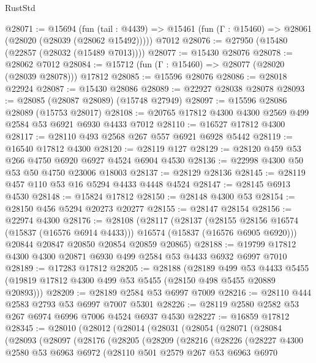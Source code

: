 \begin{lexlean}{RustStd}
\begin{coremodule}
@28071 := @15694
    (fun (tail : @4439) => @15461 (fun (Γ : @15460) => @28061 (@28020 (@28039 (@28062 @15492)))))
    @7012
@28076 := @27950 (@15480 (@22857 (@28032 (@15489 @7013))))
@28077 := @15430 @28076
@28078 := @28062 @7012
@28084 := @15712 (fun (Γ : @15460) => @28077 (@28020 (@28039 @28078))) @17812
@28085 := @15596 @28076
@28086 := @28018 @22924
@28087 := @15430 @28086
@28089 := @22927 @28038 @28078
@28093 := @28085 (@28087 @28089) (@15748 @27949)
@28097 := @15596 @28086 @28089 (@15753 @28017)
@28108 := @20765 @17812 @4300 @4300 @2569 @499 @2584 @53 @6921 @6930 @4433 @7012
@28110 := @16527 @17812 @4300
@28117 := @28110 @493 @2568 @267 @557 @6921 @6928 @5442
@28119 := @16540 @17812 @4300
@28120 := @28119 @127
@28129 := @28120 @459 @53 @266 @4750 @6920 @6927 @4524 @6904 @4530
@28136 := @22998 @4300 @50 @53 @50 @4750 @23006 @18003
@28137 := @28129 @28136
@28145 := @28119 @457 @110 @53 @16 @5294 @4433 @4448 @4524
@28147 := @28145 @6913 @4530
@28148 := @15824 @17812
@28150 := @28148 @4300 @53
@28154 := @28150 @456 @5294 @20273 @20277
@28155 := @28147 @28154
@28156 := @22974 @4300
@28176 := @28108
    (@28117
      (@28137
        (@28155 @28156 @16574 (@15837 (@16576 @6914 @4433)))
        @16574
        (@15837 (@16576 @6905 @6920)))
      @20844
      @20847
      @20850
      @20854
      @20859
      @20865)
@28188 := @19799 @17812 @4300 @4300 @20871 @6930 @499 @2584 @53 @4433 @6932 @6997 @7010
@28189 := @17283 @17812
@28205 := @28188
    (@28189
      @499
      @53
      @4433
      @5455
      (@19819 @17812 @4300 @499 @53 @5455 (@28150 @498 @5455 @20889 @20893)))
@28209 := @28189 @2584 @53 @6997 @7009
@28216 := @28110 @444 @2583 @2793 @53 @6997 @7007 @5301
@28226 := @28119 @2580 @2582 @53 @267 @6974 @6996 @7006 @4524 @6937 @4530
@28227 := @16859 @17812
@28345 := @28010
    (@28012
      (@28014
        (@28031
          (@28054
            (@28071
              (@28084
                (@28093
                  (@28097
                    (@28176
                      (@28205
                        (@28209
                          (@28216
                            (@28226
                              (@28227
                                @4300
                                @2580
                                @53
                                @6963
                                @6972
                                (@28110
                                  @501
                                  @2579
                                  @267
                                  @53
                                  @6963
                                  @6970

\end{coremodule}
\end{lexlean}
